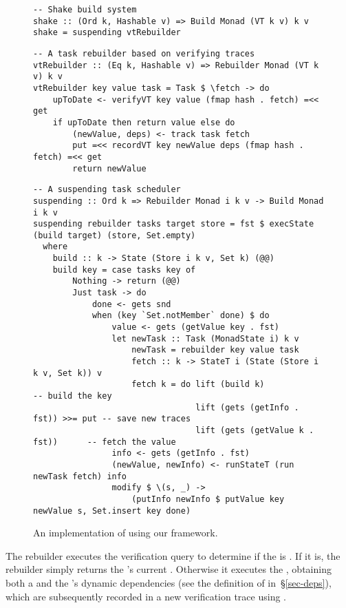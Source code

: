 \begin{figure}
\begin{verbatim}
-- Shake build system
shake :: (Ord k, Hashable v) => Build Monad (VT k v) k v
shake = suspending vtRebuilder
\end{verbatim}
\vspace{0mm}
\begin{verbatim}
-- A task rebuilder based on verifying traces
vtRebuilder :: (Eq k, Hashable v) => Rebuilder Monad (VT k v) k v
vtRebuilder key value task = Task $ \fetch -> do
    upToDate <- verifyVT key value (fmap hash . fetch) =<< get
    if upToDate then return value else do
        (newValue, deps) <- track task fetch
        put =<< recordVT key newValue deps (fmap hash . fetch) =<< get
        return newValue
\end{verbatim}
\vspace{0mm}
\begin{verbatim}
-- A suspending task scheduler
suspending :: Ord k => Rebuilder Monad i k v -> Build Monad i k v
suspending rebuilder tasks target store = fst $ execState (build target) (store, Set.empty)
  where
    build :: k -> State (Store i k v, Set k) (@@)
    build key = case tasks key of
        Nothing -> return (@@)
        Just task -> do
            done <- gets snd
            when (key `Set.notMember` done) $ do
                value <- gets (getValue key . fst)
                let newTask :: Task (MonadState i) k v
                    newTask = rebuilder key value task
                    fetch :: k -> StateT i (State (Store i k v, Set k)) v
                    fetch k = do lift (build k)                      -- build the key
                                 lift (gets (getInfo . fst)) >>= put -- save new traces
                                 lift (gets (getValue k . fst))      -- fetch the value
                info <- gets (getInfo . fst)
                (newValue, newInfo) <- runStateT (run newTask fetch) info
                modify $ \(s, _) ->
                    (putInfo newInfo $ putValue key newValue s, Set.insert key done)
\end{verbatim}
\vspace{-2mm}
\caption{An implementation of \Shake using our framework.}\label{fig-shake-implementation}
\vspace{-6mm}
\end{figure}

The rebuilder executes the verification query  to determine if the
 is . If it is, the rebuilder simply returns the 's
current . Otherwise it executes the , obtaining both a
 and the 's dynamic dependencies  (see the
definition of  in~\S\ref{sec-deps}), which are subsequently recorded
in a new verification trace using .


